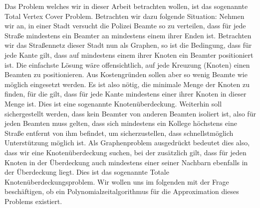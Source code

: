 \documentclass[12pt,onecolumn, notitlepage]{scrartcl}
\begin{document}
Das Problem welches wir in dieser Arbeit betrachten wollen, ist das sogenannte Total Vertex Cover Problem. Betrachten wir dazu folgende Situation:\newline
Nehmen wir an, in einer Stadt versucht die Polizei Beamte so zu verteilen, dass für jede Straße mindestens ein Beamter an mindestens einem ihrer Enden ist. Betrachten wir das Straßennetz dieser Stadt nun als Graphen, so ist die Bedingung, dass für jede Kante gilt, dass auf mindestens einem ihrer Knoten ein Beamter positioniert ist. Die einfachste Lösung wäre offensichtlich, auf jede Kreuzung (Knoten) einen Beamten zu positionieren. Aus Kostengründen sollen aber so wenig Beamte wie möglich eingesetzt werden. Es ist also nötig, die minimale Menge der Knoten zu finden, für die gilt, dass für jede Kante mindestens einer ihrer Knoten in dieser Menge ist. Dies ist eine sogenannte Knotenüberdeckung. Weiterhin soll sichergestellt werden, dass kein Beamter von anderen Beamten isoliert ist, also für jeden Beamten muss gelten, dass sich mindestens ein Kollege höchstens eine Straße entfernt von ihm befindet, um sicherzustellen, dass schnellstmöglich Unterstützung möglich ist. Als Graphenproblem ausgedrückt bedeutet dies also, dass wir eine Knotenüberdeckung suchen, bei der zusätzlich gilt, dass für jeden Knoten in der Überdeckung auch mindestens einer seiner Nachbarn ebenfalls in der Überdeckung liegt. Dies ist das sogenannte \glqq Totale Knotenüberdeckungsproblem\grqq{}. Wir wollen uns im folgenden mit der Frage beschäftigen, ob ein Polynomialzeitalgorithmus für die Approximation dieses Problems existiert.
\end{document}
